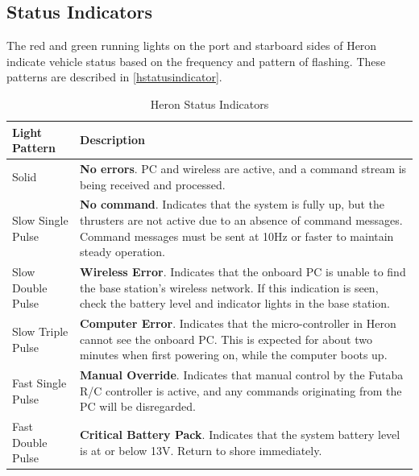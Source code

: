 \documentclass[]{clearpath-latex/clearpath-manual}
\begin{document}
\subsection{Status Indicators} \label{statusindicators}
The red and green running lights on the port and starboard sides of Heron indicate vehicle status based on the frequency and pattern of flashing. These patterns are described in \autoref{hstatusindicator}.

\bgroup
\def\arraystretch{1.5}%
\begin{table}[h]
\centering
\begin{tabular}{m{} p{}}
\rowcolor{lightgrey}
Light Pattern     & Description                                                                                                                                                                                              \\ \hline
Solid             & \textbf{No errors}. PC and wireless are active, and a command stream is being received and processed.                                                                                                             \\ \hline
Slow Single Pulse & \textbf{No command}. Indicates that the system is fully up, but the thrusters are not active due to an absence of command messages. Command messages must be sent at 10Hz or faster to maintain steady operation. \\ \hline
Slow Double Pulse & \textbf{Wireless Error}. Indicates that the onboard PC is unable to find the base station’s wireless network. If this indication is seen, check the battery level and indicator lights in the base station.       \\ \hline
Slow Triple Pulse & \textbf{Computer Error}. Indicates that the micro-controller in Heron cannot see the onboard PC. This is expected for about two minutes when first powering on, while the computer boots up.                  \\ \hline
Fast Single Pulse & \textbf{Manual Override}. Indicates that manual control by the Futaba R/C controller is active, and any commands originating from the PC will be disregarded.                                                     \\ \hline
Fast Double Pulse & \textbf{Critical Battery Pack}. Indicates that the system battery level is at or below 13V. Return to shore immediately. \\ \hline
\end{tabular}
\newline
\caption{Heron Status Indicators}
\label{hstatusindicator}
\end{table}
\egroup
\end{document}
